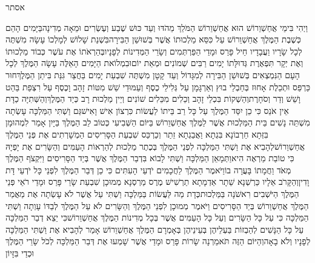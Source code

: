 \documentclass[../main/main.tex]{subfiles}
\begin{document}
\Incipit{}אסתר\par
\vspace{\afterchapskip}
\RTLmulticolcolumns
\begin{multicols}{\ncols}
וַיְהִי בִּימֵי אֲחַשְׁוֵרוֹשׁ הוּא אֲחַשְׁוֵרוֹשׁ הַמֹּלֵךְ מֵהֹדּוּ וְעַד כּוּשׁ שֶׁבַע וְעֶשְׂרִים וּמֵאָה מְדִינָה\PreVerseSpace{}בַּיָּמִים הָהֵם כְּשֶׁבֶת הַמֶּלֶךְ אֲחַשְׁוֵרוֹשׁ עַל כִּסֵּא מַלְכוּתוֹ אֲשֶׁר בְּשׁוּשַׁן הַבִּירָה\PreVerseSpace{}בִּשְׁנַת שָׁלוֹשׁ לְמָלְכוֹ עָשָׂה מִשְׁתֶּה לְכָל שָׂרָיו וַעֲבָדָיו חֵיל פָּרַס וּמָדַי הַפַּרְתְּמִים וְשָׂרֵי הַמְּדִינוֹת לְפָנָיו\PreVerseSpace{}בְּהַרְאֹתוֹ אֶת עֹשֶׁר כְּבוֹד מַלְכוּתוֹ וְאֶת יְקָר תִּפְאֶרֶת גְּדוּלָּתוֹ יָמִים רַבִּים שְׁמוֹנִים וּמְאַת יוֹם\PreVerseSpace{}וּבִמְלוֹאת הַיָּמִים הָאֵלֶּה עָשָׂה הַמֶּלֶךְ לְכָל הָעָם הַנִּמְצְאִים בְּשׁוּשַׁן הַבִּירָה לְמִגָּדוֹל וְעַד קָטָן מִשְׁתֶּה שִׁבְעַת יָמִים בַּחֲצַר גִּנַּת בִּיתַן הַמֶּלֶךְ\PreVerseSpace{}חוּר כַּרְפַּס וּתְכֵלֶת אָחוּז בְּחַבְלֵי בוּץ וְאַרְגָּמָן עַל גְּלִילֵי כֶסֶף וְעַמּוּדֵי שֵׁשׁ מִטּוֹת זָהָב וָכֶסֶף עַל רִצְפַת בַּהַט וָשֵׁשׁ וְדַר וְסֹחָרֶת\PreVerseSpace{}וְהַשְׁקוֹת בִּכְלֵי זָהָב וְכֵלִים מִכֵּלִים שׁוֹנִים וְיֵין מַלְכוּת רָב כְּיַד הַמֶּלֶךְ\PreVerseSpace{}וְהַשְּׁתִיָּה כַדָּת אֵין אֹנֵס כִּי כֵן יִסַּד הַמֶּלֶךְ עַל כָּל רַב בֵּיתוֹ לַעֲשׂוֹת כִּרְצוֹן אִישׁ וָאִישׁ\PreVerseSpace{}גַּם וַשְׁתִּי הַמַּלְכָּה עָשְׂתָה מִשְׁתֵּה נָשִׁים בֵּית הַמַּלְכוּת אֲשֶׁר לַמֶּלֶךְ אֲחַשְׁוֵרוֹשׁ \ClosedSection{}בַּיּוֹם הַשְּׁבִיעִי כְּטוֹב לֵב הַמֶּלֶךְ בַּיָּיִן אָמַר לִמְהוּמָן בִּזְּתָא חַרְבוֹנָא בִּגְתָא וַאֲבַגְתָא זֵתַר וְכַרְכַּס שִׁבְעַת הַסָּרִיסִים הַמְשָׁרְתִים אֶת פְּנֵי הַמֶּלֶךְ אֲחַשְׁוֵרוֹשׁ\PreVerseSpace{}לְהָבִיא אֶת וַשְׁתִּי הַמַּלְכָּה לִפְנֵי הַמֶּלֶךְ בְּכֶתֶר מַלְכוּת לְהַרְאוֹת הָעַמִּים וְהַשָּׂרִים אֶת יָפְיָהּ כִּי טוֹבַת מַרְאֶה הִיא\PreVerseSpace{}וַתְּמָאֵן הַמַּלְכָּה וַשְׁתִּי לָבוֹא בִּדְבַר הַמֶּלֶךְ אֲשֶׁר בְּיַד הַסָּרִיסִים וַיִּקְצֹף הַמֶּלֶךְ מְאֹד וַחֲמָתוֹ בָּעֲרָה בוֹ\PreVerseSpace{}וַיֹּאמֶר הַמֶּלֶךְ לַחֲכָמִים יֹדְעֵי הָעִתִּים כִּי כֵן דְּבַר הַמֶּלֶךְ לִפְנֵי כָּל יֹדְעֵי דָּת וָדִין\PreVerseSpace{}וְהַקָּרֹב אֵלָיו כַּרְשְׁנָא שֵׁתָר אַדְמָתָא תַרְשִׁישׁ מֶרֶס מַרְסְנָא מְמוּכָן שִׁבְעַת שָׂרֵי פָּרַס וּמָדַי רֹאֵי פְּנֵי הַמֶּלֶךְ הַיֹּשְׁבִים רִאשֹׁנָה בַּמַּלְכוּת\PreVerseSpace{}כְּדָת מַה לַּעֲשׂוֹת בַּמַּלְכָּה וַשְׁתִּי עַל אֲשֶׁר לֹא עָשְׂתָה אֶת מַאֲמַר הַמֶּלֶךְ אֲחַשְׁוֵרוֹשׁ בְּיַד הַסָּרִיסִים \ClosedSection{}וַיֹּאמֶר מְמוּכָן\SubEnd{} לִפְנֵי הַמֶּלֶךְ וְהַשָּׂרִים לֹא עַל הַמֶּלֶךְ לְבַדּוֹ עָוְתָה וַשְׁתִּי הַמַּלְכָּה כִּי עַל כָּל הַשָּׂרִים וְעַל כָּל הָעַמִּים אֲשֶׁר בְּכָל מְדִינוֹת הַמֶּלֶךְ אֲחַשְׁוֵרוֹשׁ\PreVerseSpace{}כִּי יֵצֵא דְבַר הַמַּלְכָּה עַל כָּל הַנָּשִׁים לְהַבְזוֹת בַּעְלֵיהֶן בְּעֵינֵיהֶן בְּאָמְרָם הַמֶּלֶךְ אֲחַשְׁוֵרוֹשׁ אָמַר לְהָבִיא אֶת וַשְׁתִּי הַמַּלְכָּה לְפָנָיו וְלֹא בָאָה\PreVerseSpace{}וְהַיּוֹם הַזֶּה תֹּאמַרְנָה שָׂרוֹת פָּרַס וּמָדַי אֲשֶׁר שָׁמְעוּ אֶת דְּבַר הַמַּלְכָּה לְכֹל שָׂרֵי הַמֶּלֶךְ וּכְדַי בִּזָּיוֹן 
\end{multicols}
\end{document}
